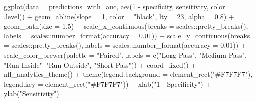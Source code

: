 \documentclass[
  letterpaper,
]{krantz}
\newenvironment{Shaded}{\begin{snugshade}}{\end{snugshade}}
\newcommand{\AttributeTok}[1]{\textcolor[rgb]{0.40,0.45,0.13}{#1}}
\newcommand{\DecValTok}[1]{\textcolor[rgb]{0.68,0.00,0.00}{#1}}
\newcommand{\FloatTok}[1]{\textcolor[rgb]{0.68,0.00,0.00}{#1}}
\newcommand{\FunctionTok}[1]{\textcolor[rgb]{0.28,0.35,0.67}{#1}}
\newcommand{\NormalTok}[1]{\textcolor[rgb]{0.00,0.23,0.31}{#1}}
\newcommand{\SpecialCharTok}[1]{\textcolor[rgb]{0.37,0.37,0.37}{#1}}
\newcommand{\StringTok}[1]{\textcolor[rgb]{0.13,0.47,0.30}{#1}}
\begin{document}
\begin{Shaded}
\begin{Highlighting}[]
\FunctionTok{ggplot}\NormalTok{(}\AttributeTok{data =}\NormalTok{ predictions\_with\_auc, }\FunctionTok{aes}\NormalTok{(}\DecValTok{1} \SpecialCharTok{{-}}\NormalTok{ specificity,}
\NormalTok{                                        sensitivity, }\AttributeTok{color =}\NormalTok{ .level)) }\SpecialCharTok{+}
  \FunctionTok{geom\_abline}\NormalTok{(}\AttributeTok{slope =} \DecValTok{1}\NormalTok{, }\AttributeTok{color =} \StringTok{"black"}\NormalTok{, }\AttributeTok{lty =} \DecValTok{23}\NormalTok{, }\AttributeTok{alpha =} \FloatTok{0.8}\NormalTok{) }\SpecialCharTok{+}
  \FunctionTok{geom\_path}\NormalTok{(}\AttributeTok{size =} \FloatTok{1.5}\NormalTok{) }\SpecialCharTok{+}
  \FunctionTok{scale\_x\_continuous}\NormalTok{(}\AttributeTok{breaks =}\NormalTok{ scales}\SpecialCharTok{::}\FunctionTok{pretty\_breaks}\NormalTok{(),}
                     \AttributeTok{labels =}\NormalTok{ scales}\SpecialCharTok{::}\FunctionTok{number\_format}\NormalTok{(}\AttributeTok{accuracy =} \FloatTok{0.01}\NormalTok{)) }\SpecialCharTok{+}
  \FunctionTok{scale\_y\_continuous}\NormalTok{(}\AttributeTok{breaks =}\NormalTok{ scales}\SpecialCharTok{::}\FunctionTok{pretty\_breaks}\NormalTok{(),}
                     \AttributeTok{labels =}\NormalTok{ scales}\SpecialCharTok{::}\FunctionTok{number\_format}\NormalTok{(}\AttributeTok{accuracy =} \FloatTok{0.01}\NormalTok{)) }\SpecialCharTok{+}
  \FunctionTok{scale\_color\_brewer}\NormalTok{(}\AttributeTok{palette =} \StringTok{"Paired"}\NormalTok{,}
                     \AttributeTok{labels =} \FunctionTok{c}\NormalTok{(}\StringTok{"Long Pass"}\NormalTok{, }\StringTok{"Medium Pass"}\NormalTok{, }\StringTok{"Run Inside"}\NormalTok{,}
                                                    \StringTok{"Run Outside"}\NormalTok{, }\StringTok{"Short Pass"}\NormalTok{)) }\SpecialCharTok{+}
  \FunctionTok{coord\_fixed}\NormalTok{() }\SpecialCharTok{+}
  \FunctionTok{nfl\_analytics\_theme}\NormalTok{() }\SpecialCharTok{+}
  \FunctionTok{theme}\NormalTok{(}\AttributeTok{legend.background =} \FunctionTok{element\_rect}\NormalTok{(}\StringTok{"\#F7F7F7"}\NormalTok{),}
        \AttributeTok{legend.key =} \FunctionTok{element\_rect}\NormalTok{(}\StringTok{"\#F7F7F7"}\NormalTok{)) }\SpecialCharTok{+}
  \FunctionTok{xlab}\NormalTok{(}\StringTok{"1 {-} Specificity"}\NormalTok{) }\SpecialCharTok{+}
  \FunctionTok{ylab}\NormalTok{(}\StringTok{"Sensitivity"}\NormalTok{)}
\end{Highlighting}
\end{Shaded}
\end{document}
